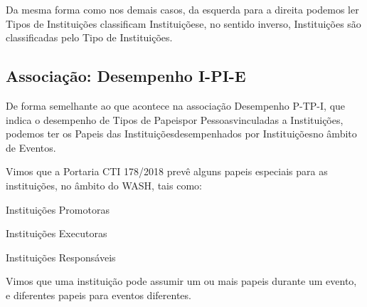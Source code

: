 \documentclass[
12pt,		%
openright,	%
twoside,  %
a4paper,			%
chapter=TITLE,		%
english,			%
french,				%
spanish,			%
brazil				%
]{USPSC-classe/USPSC}
\begin{document}
Da mesma forma como nos demais casos, da esquerda para a direita podemos ler \textquotedbl Tipos de Institui\c{c}\~oes classificam Institui\c{c}\~oes\textquotedbl  e, no sentido inverso, \textquotedbl Institui\c{c}\~oes s\~ao classificadas pelo Tipo de Institui\c{c}\~oes\textquotedbl .














\subsection[Associa\c{c}\~ao: Desempenho I-PI-E]{Associa\c{c}\~ao: Desempenho I-PI-E}\label{Associa\c{c}\~ao: Desempenho I-PI-E}
De forma semelhante ao que acontece na associa\c{c}\~ao \textquotedbl Desempenho P-TP-I\textquotedbl , que indica o desempenho de \textquotedbl Tipos de Papeis\textquotedbl  por \textquotedbl Pessoas\textquotedbl  vinculadas a \textquotedbl Institui\c{c}\~oes\textquotedbl , podemos ter os \textquotedbl Papeis das Institui\c{c}\~oes\textquotedbl  desempenhados por \textquotedbl Institui\c{c}\~oes\textquotedbl  no \^ambito de \textquotedbl Eventos\textquotedbl .














Vimos que a Portaria CTI 178/2018 prev\^e alguns papeis especiais para as institui\c{c}\~oes, no \^ambito do WASH, tais como:















\begin{alineas}
\item Institui\c{c}\~oes Promotoras
\item Institui\c{c}\~oes Executoras
\item Institui\c{c}\~oes Respons\'aveis
\end{alineas}

Vimos que uma institui\c{c}\~ao pode assumir um ou mais papeis durante um evento, e diferentes papeis para eventos diferentes.
\end{document}
